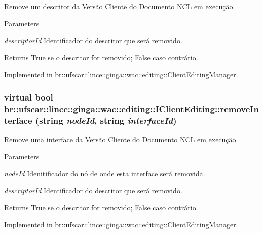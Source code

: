 Remove um descritor da Versão Cliente do Documento NCL em execução. 


\begin{DoxyParams}{Parameters}
\item[{\em descriptorId}]Identificador do descritor que será removido. \end{DoxyParams}
\begin{DoxyReturn}{Returns}
True se o descritor for removido; False caso contrário. 
\end{DoxyReturn}


Implemented in \hyperlink{classbr_1_1ufscar_1_1lince_1_1ginga_1_1wac_1_1editing_1_1ClientEditingManager_a9b25cb3580c52ddb8147ede64ec53077}{br::ufscar::lince::ginga::wac::editing::ClientEditingManager}.

\hypertarget{classbr_1_1ufscar_1_1lince_1_1ginga_1_1wac_1_1editing_1_1IClientEditing_abe89650753eccb62bf1772cc0e87d6b7}{
\subsubsection[{removeInterface}]{\setlength{\rightskip}{0pt plus 5cm}virtual bool br::ufscar::lince::ginga::wac::editing::IClientEditing::removeInterface (string {\em nodeId}, \/  string {\em interfaceId})}}
\label{classbr_1_1ufscar_1_1lince_1_1ginga_1_1wac_1_1editing_1_1IClientEditing_abe89650753eccb62bf1772cc0e87d6b7}


Remove uma interface da Versão Cliente do Documento NCL em execução. 


\begin{DoxyParams}{Parameters}
\item[{\em nodeId}]Idenitificador do nó de onde esta interface será removida. \item[{\em descriptorId}]Identificador do descritor que será removido. \end{DoxyParams}
\begin{DoxyReturn}{Returns}
True se o descritor for removido; False caso contrário. 
\end{DoxyReturn}


Implemented in \hyperlink{classbr_1_1ufscar_1_1lince_1_1ginga_1_1wac_1_1editing_1_1ClientEditingManager_a23d60db841bf10edd6266de52613b9b2}{br::ufscar::lince::ginga::wac::editing::ClientEditingManager}.

